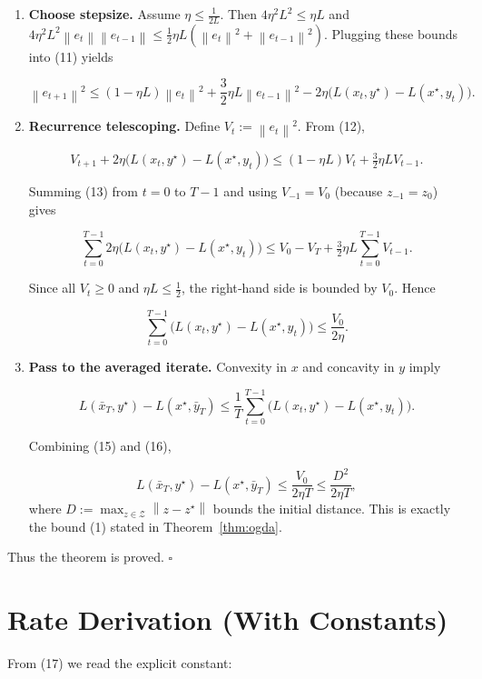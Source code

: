 \documentclass{article}
\newcommand{\norm}[1]{\left\|#1\right\|}
\begin{document}
\begin{enumerate}
Thus (10) becomes  

\[
\norm{e_{t+1}}^{2}
\le \norm{e_t}^{2}
-2\eta\big(L(x_t,y^\star)-L(x^\star,y_t)\big)
+4\eta^{2}L^{2}\norm{e_t}^{2}
+\eta^{2}L^{2}\norm{e_{t-1}}^{2}
+4\eta^{2}L^{2}\norm{e_t}\norm{e_{t-1}}.
\tag{11}
\]

\item[Step 7.] \textbf{Choose stepsize.}  
Assume \(\eta\le\frac{1}{2L}\).  Then \(4\eta^{2}L^{2}\le \eta L\) and
\(4\eta^{2}L^{2}\norm{e_t}\norm{e_{t-1}}\le\frac{1}{2}\eta L(\norm{e_t}^{2}+\norm{e_{t-1}}^{2})\).
Plugging these bounds into (11) yields  

\[
\norm{e_{t+1}}^{2}
\le (1-\eta L)\norm{e_t}^{2}
+\frac{3}{2}\eta L\norm{e_{t-1}}^{2}
-2\eta\big(L(x_t,y^\star)-L(x^\star,y_t)\big).
\tag{12}
\]

\item[Step 8.] \textbf{Recurrence telescoping.}  
Define \(V_t:=\norm{e_t}^{2}\).  From (12),

\[
V_{t+1}+2\eta\big(L(x_t,y^\star)-L(x^\star,y_t)\big)
\le (1-\eta L)V_t+\tfrac{3}{2}\eta L V_{t-1}.
\tag{13}
\]

Summing (13) from \(t=0\) to \(T-1\) and using \(V_{-1}=V_0\) (because \(z_{-1}=z_0\))
gives  

\[
\sum_{t=0}^{T-1}2\eta\big(L(x_t,y^\star)-L(x^\star,y_t)\big)
\le V_0-V_T+\tfrac{3}{2}\eta L\sum_{t=0}^{T-1}V_{t-1}.
\tag{14}
\]

Since all \(V_t\ge0\) and \(\eta L\le\frac12\), the right‑hand side is bounded by
\(V_0\).  Hence  

\[
\sum_{t=0}^{T-1}\big(L(x_t,y^\star)-L(x^\star,y_t)\big)
\le \frac{V_0}{2\eta}.
\tag{15}
\]

\item[Step 9.] \textbf{Pass to the averaged iterate.}  
Convexity in \(x\) and concavity in \(y\) imply  

\[
L(\bar x_T,y^\star)-L(x^\star,\bar y_T)
\le\frac{1}{T}\sum_{t=0}^{T-1}\big(L(x_t,y^\star)-L(x^\star,y_t)\big).
\tag{16}
\]

Combining (15) and (16),

\[
L(\bar x_T,y^\star)-L(x^\star,\bar y_T)
\le\frac{V_0}{2\eta T}
\le\frac{D^{2}}{2\eta T},
\tag{17}
\]
where \(D:=\max_{z\in\mathcal{Z}}\norm{z-z^\star}\) bounds the initial distance.
This is exactly the bound (1) stated in Theorem~\ref{thm:ogda}.
\end{enumerate}
Thus the theorem is proved. \(\square\)

\section*{Rate Derivation (With Constants)}
From (17) we read the explicit constant:
\end{document}
